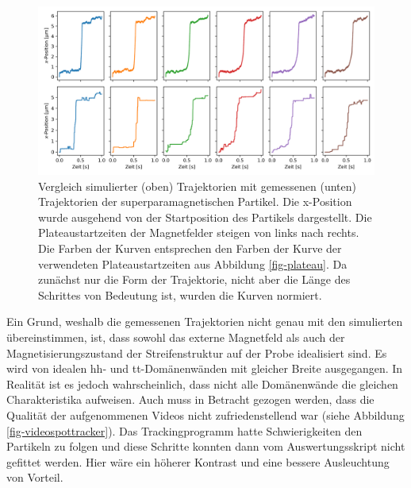 \documentclass[page,pdftex,12pt,a4paper,twoside,openright]{scrbook}
\begin{document}
\begin{figure}[htbp]
\centering
\includegraphics[width=\textwidth]{./img/sim.png}
\caption{\label{fig-traj}
Vergleich simulierter (oben) Trajektorien mit gemessenen (unten) Trajektorien der superparamagnetischen Partikel. Die x-Position wurde ausgehend von der Startposition des Partikels dargestellt. Die Plateaustartzeiten der Magnetfelder steigen von links nach rechts. Die Farben der Kurven entsprechen den Farben der Kurve der verwendeten Plateaustartzeiten aus Abbildung \ref{fig-plateau}. Da zunächst nur die Form der Trajektorie, nicht aber die Länge des Schrittes von Bedeutung ist, wurden die Kurven normiert.}
\end{figure}


Ein Grund, weshalb die gemessenen Trajektorien nicht genau mit den simulierten übereinstimmen, ist, dass sowohl das externe Magnetfeld als auch der Magnetisierungszustand der Streifenstruktur auf der Probe idealisiert sind. Es wird von idealen hh- und tt-Domänenwänden mit gleicher Breite ausgegangen. In Realität ist es jedoch wahrscheinlich, dass nicht alle Domänenwände die gleichen Charakteristika aufweisen. Auch muss in Betracht gezogen werden, dass die Qualität der aufgenommenen Videos nicht zufriedenstellend war (siehe Abbildung \ref{fig-videospottracker}). Das Trackingprogramm hatte Schwierigkeiten den Partikeln zu folgen und diese Schritte konnten dann vom Auswertungsskript nicht gefittet werden. Hier wäre ein höherer Kontrast und eine bessere Ausleuchtung von Vorteil.\\
\end{document}

